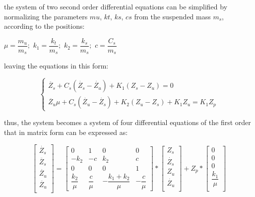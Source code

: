 \documentclass[tesi]{subfiles}
\begin{document}
the system of two second order differential equations can be simplified by normalizing the parameters $mu$, $kt$, $ks$, $cs$ from the suspended mass $m_{s}$, according to the positions\cite{gillespie1992everything}:

        \begin{center}
       		$\mu = \dfrac{m_{u}}{m_{s}}; $ \quad
        	$k_{1} = \dfrac{k_{t}}{m_{s}} ; $ \quad
        	$k_{2} = \dfrac{k_{s}}{m_{s}} ; $ \quad
       		$c = \dfrac{C_{s}}{m_{s}}$
		\end{center}
leaving the equations in this form:

\begin{center}

\[
    \left\{
                \begin{array}{ll}
                  \ddot{Z_{s}} + C_{s} ( \dot{Z_{s}} - \dot{Z_{u}} ) + K_{1} (Z_{s} - Z_{u}) = 0\\
                  \ddot{Z_{u}} \mu + C_{s} ( \dot{Z_{u}} - \dot{Z_{s}}) + K_{2} (Z_{u} - Z_{s}) + K_{1}Z_{u}  = K_{1}Z_{p}
                \end{array}
              \right.
\]




\end{center}
thus, the system becomes a system of four differential equations of the first order that in matrix form can be expressed as:
\begin{center}
\[
\begin{bmatrix}
    \dot{Z_{s}}\\
    \ddot{Z_{s}} \\
    \dot{Z_{u}}\\
    \ddot{Z_{u}} \\
\end{bmatrix}
=
\begin{bmatrix}
    0 & 1 & 0 & 0 \\
    -k_{2} & -c & k_{2} & c \\
    0 & 0 & 0 & 1 \\
    \dfrac{k_{2}}{\mu} & \dfrac{c}{\mu} & -\dfrac{k_{1} + k_{2}}{\mu} & -\dfrac{c}{\mu} 
\end{bmatrix}
*
\begin{bmatrix}
    Z_{s}\\
    \dot{Z_{s}} \\
    Z_{u}\\
    \dot{Z_{u}} \\
\end{bmatrix}
+Z_{p}*
\begin{bmatrix}
    0\\
    0\\
    0\\
    \dfrac{k_{1}}{\mu} \\
\end{bmatrix}
\]
\end{center}
\end{document}
